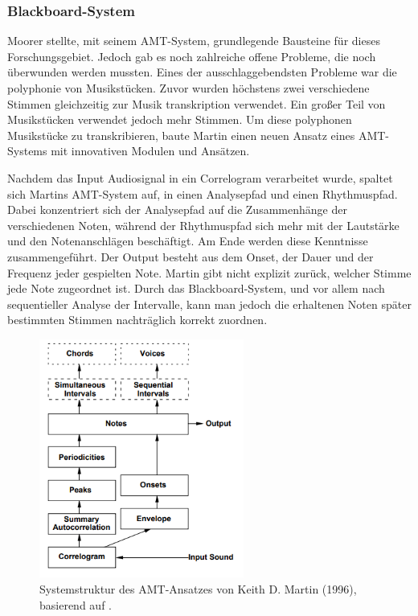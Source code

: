 \subsubsection{Blackboard-System}
Moorer stellte, mit seinem AMT-System, grundlegende Bausteine für dieses Forschungsgebiet.
Jedoch gab es noch zahlreiche offene Probleme, die noch überwunden werden mussten.
Eines der ausschlaggebendsten Probleme war die polyphonie von Musikstücken.
\cite{Martin1996}
Zuvor wurden höchstens zwei verschiedene Stimmen gleichzeitig zur Musik transkription verwendet.
Ein großer Teil von Musikstücken verwendet jedoch mehr Stimmen.
Um diese polyphonen Musikstücke zu transkribieren,
baute Martin einen neuen Ansatz eines AMT-Systems mit innovativen Modulen und Ansätzen.

Nachdem das Input Audiosignal in ein Correlogram verarbeitet wurde,
spaltet sich Martins AMT-System auf, in einen Analysepfad und einen Rhythmuspfad.
Dabei konzentriert sich der Analysepfad auf die Zusammenhänge der verschiedenen Noten,
während der Rhythmuspfad sich mehr mit der Lautstärke und den Notenanschlägen beschäftigt.
Am Ende werden diese Kenntnisse zusammengeführt.
Der Output besteht aus dem Onset, der Dauer und der Frequenz jeder gespielten Note.
Martin gibt nicht explizit zurück, welcher Stimme jede Note zugeordnet ist.
Durch das Blackboard-System, und vor allem nach sequentieller Analyse der Intervalle, kann man
jedoch die erhaltenen Noten später bestimmten Stimmen nachträglich korrekt zuordnen.

\begin{figure}[H]
    \centering
    \includegraphics[width=0.6\textwidth]{Graphics/Martin1996Structure}
    \caption{Systemstruktur des AMT-Ansatzes von Keith D. Martin (1996), basierend auf \cite{Martin1996}.}
    \label{fig:martin-structure}
\end{figure}

